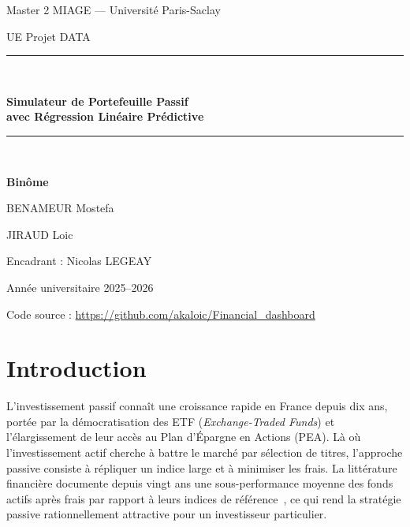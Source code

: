 \documentclass[11pt,a4paper]{article}
\begin{document}
\begin{titlepage}
\centering
\vspace*{2cm}

{\Large Master 2 MIAGE --- Université Paris-Saclay\par}
\vspace{0.3cm}
{\large UE Projet DATA\par}
\vspace{2.5cm}

\rule{\linewidth}{0.5mm}\\[0.6cm]
{\huge\bfseries Simulateur de Portefeuille Passif\\
avec Régression Linéaire Prédictive\par}
\vspace{0.4cm}
\rule{\linewidth}{0.5mm}\\[1.5cm]

{\large\bfseries Binôme\par}
\vspace{0.3cm}
{\large BENAMEUR Mostefa\par}
{\large JIRAUD Loic\par}

\vfill

{\large Encadrant : Nicolas LEGEAY\par}
\vspace{0.3cm}
{\large Année universitaire 2025--2026\par}

\vspace{1cm}
{\small Code source : \url{https://github.com/akaloic/Financial_dashboard}\par}
\end{titlepage}

\tableofcontents
\thispagestyle{empty}
\newpage
\setcounter{page}{1}

\section{Introduction}

L'investissement passif connaît une croissance rapide en France depuis dix
ans, portée par la démocratisation des ETF (\textit{Exchange-Traded Funds})
et l'élargissement de leur accès au Plan d'Épargne en Actions (PEA). Là où
l'investissement actif cherche à battre le marché par sélection de titres,
l'approche passive consiste à répliquer un indice large et à minimiser les
frais. La littérature financière documente depuis vingt ans une
sous-performance moyenne des fonds actifs après frais par rapport à leurs
indices de référence~\cite{spiva}, ce qui rend la stratégie passive
rationnellement attractive pour un investisseur particulier.
\end{document}
